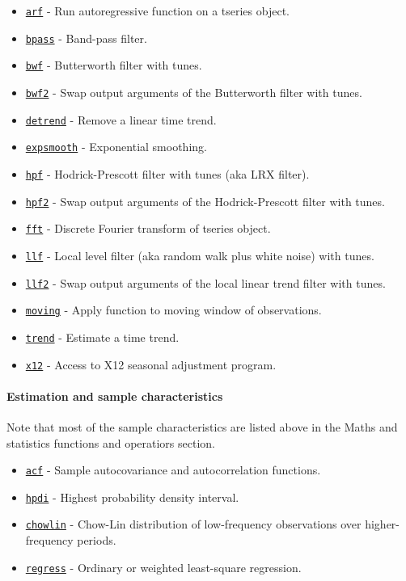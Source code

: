  \begin{itemize}
 \item
   \href{tseries/arf}{\texttt{arf}} - Run autoregressive function on a
   tseries object.
 \item
   \href{tseries/bpass}{\texttt{bpass}} - Band-pass filter.
 \item
   \href{tseries/bwf}{\texttt{bwf}} - Butterworth filter with tunes.
 \item
   \href{tseries/bwf2}{\texttt{bwf2}} - Swap output arguments of the
   Butterworth filter with tunes.
 \item
   \href{tseries/detrend}{\texttt{detrend}} - Remove a linear time trend.
 \item
   \href{tseries/expsmooth}{\texttt{expsmooth}} - Exponential smoothing.
 \item
   \href{tseries/hpf}{\texttt{hpf}} - Hodrick-Prescott filter with tunes
   (aka LRX filter).
 \item
   \href{tseries/hpf2}{\texttt{hpf2}} - Swap output arguments of the
   Hodrick-Prescott filter with tunes.
 \item
   \href{tseries/fft}{\texttt{fft}} - Discrete Fourier transform of
   tseries object.
 \item
   \href{tseries/llf}{\texttt{llf}} - Local level filter (aka random walk
   plus white noise) with tunes.
 \item
   \href{tseries/llf2}{\texttt{llf2}} - Swap output arguments of the
   local linear trend filter with tunes.
 \item
   \href{tseries/moving}{\texttt{moving}} - Apply function to moving
   window of observations.
 \item
   \href{tseries/trend}{\texttt{trend}} - Estimate a time trend.
 \item
   \href{tseries/x12}{\texttt{x12}} - Access to X12 seasonal adjustment
   program.
 \end{itemize}
 
 \paragraph{Estimation and sample characteristics}
 
 Note that most of the sample characteristics are listed above in the
 Maths and statistics functions and operatiors section.
 
 \begin{itemize}
 \item
   \href{tseries/acf}{\texttt{acf}} - Sample autocovariance and
   autocorrelation functions.
 \item
   \href{tseries/hpdi}{\texttt{hpdi}} - Highest probability density
   interval.
 \item
   \href{tseries/chowlin}{\texttt{chowlin}} - Chow-Lin distribution of
   low-frequency observations over higher-frequency periods.
 \item
   \href{tseries/regress}{\texttt{regress}} - Ordinary or weighted
   least-square regression.
 \end{itemize}
 

